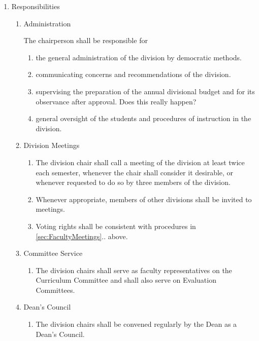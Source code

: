 \documentclass{manual}
\newcommand{\itemLevelA}{\alph*.}
\newcommand{\itemLevelB}{\arabic*)}
\newcommand{\itemLevelC}{\alph*)}
\newcommand{\itemRefA}{\alph*}
\newcommand{\itemRefB}{\arabic*}
\newcommand{\itemRefC}{\alph*}
\begin{document}
\begin{enumerate}[label=\itemLevelA,ref=\itemRefA]
\item \label{item:responsibilities01} Responsibilities
\begin{enumerate}[label=\itemLevelB,ref=\itemRefB]
\item Administration

The chairperson shall be responsible for
\begin{enumerate}[label=\itemLevelC,ref=\itemRefC]
\item the general administration of the division by democratic methods.
\item communicating concerns and recommendations of the division.
\item supervising the preparation of the annual divisional budget and for its observance after approval. Does this really happen?
\item general oversight of the students and procedures of instruction in the division.
\end{enumerate}

\item Division Meetings
\begin{enumerate}[label=\itemLevelC,ref=\itemRefC]
\item The division chair shall call a meeting of the division at least twice each semester, whenever the chair shall consider it desirable, or whenever requested to do so by three members of the division.
\item Whenever appropriate, members of other divisions shall be invited to meetings.
\item Voting rights shall be consistent with procedures in \cref{sec:FacultyMeetings}.. above.
\end{enumerate}

\item Committee Service
\begin{enumerate}[label=\itemLevelC,ref=\itemRefC]
\item The division chairs shall serve as faculty representatives on the Curriculum Committee and shall also serve on Evaluation Committees. 
\end{enumerate}

\item \label{iitem:deansCouncil02} Dean's Council
\begin{enumerate}[label=\itemLevelC,ref=\itemRefC]
\item The division chairs shall be convened regularly by the Dean as a Dean's Council.


\end{enumerate}
\end{enumerate}
\end{enumerate}
\end{document}
